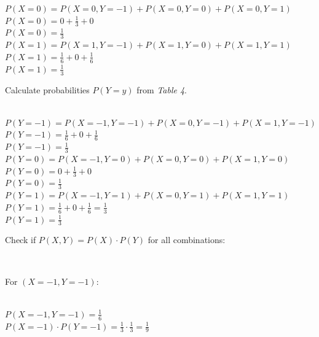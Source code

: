 \documentclass{article}
\begin{document}
$P(X = 0) = P(X = 0, Y = -1) + P(X = 0, Y = 0) + P(X = 0, Y = 1)$\\

$P(X = 0) = 0 + \frac{1}{3} + 0 $\\

$P(X = 0)= \frac{1}{3}$\\

$P(X = 1) = P(X = 1, Y = -1) + P(X = 1, Y = 0) + P(X = 1, Y = 1)$\\

$P(X = 1) = \frac{1}{6} + 0 + \frac{1}{6} $\\

$P(X = 1)= \frac{1}{3}$\\

\parbox{\textwidth}{Calculate probabilities $P(Y = y)$ from \textit{Table 4}.}\\

$P(Y = -1) = P(X = -1, Y = -1) + P(X = 0, Y = -1) + P(X = 1, Y = -1)$\\

$P(Y = -1) = \frac{1}{6} + 0 + \frac{1}{6} $\\

$P(Y = -1) = \frac{1}{3}$\\

$P(Y = 0) = P(X = -1, Y = 0) + P(X = 0, Y = 0) + P(X = 1, Y = 0)$\\

$P(Y = 0) = 0 + \frac{1}{3} + 0 $\\

$P(Y = 0) = \frac{1}{3}$\\

$P(Y = 1) = P(X = -1, Y = 1) + P(X = 0, Y = 1) + P(X = 1, Y = 1)$\\

$P(Y = 1) = \frac{1}{6} + 0 + \frac{1}{6} = \frac{1}{3}$\\

$P(Y = 1) = \frac{1}{3}$\\

\parbox{\textwidth}{Check if $P(X , Y) = P(X) \cdot P(Y)$ for all combinations:}\\

\parbox{\textwidth}{For $(X = -1, Y = -1)$:}\\

$P(X = -1, Y = -1) = \frac{1}{6}$\\

$P(X = -1) \cdot P(Y = -1) = \frac{1}{3} \cdot \frac{1}{3} = \frac{1}{9}$\\
\end{document}
